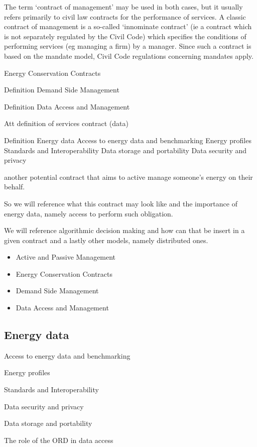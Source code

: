 \documentclass[]{book}
\theoremstyle{definition}
\theoremstyle{definition}
\theoremstyle{definition}
\theoremstyle{remark}
\begin{document}
The term `contract of management' may be used in both cases, but it
usually refers primarily to civil law contracts for the performance of
services. A classic contract of management is a so-called `innominate
contract' (ie a contract which is not separately regulated by the Civil
Code) which specifies the conditions of performing services (eg managing
a firm) by a manager. Since such a contract is based on the mandate
model, Civil Code regulations concerning mandates apply.

Energy Conservation Contracts

Definition Demand Side Management

Definition Data Access and Management

Att definition of services contract (data)

Definition Energy data Access to energy data and benchmarking Energy
profiles Standards and Interoperability Data storage and portability
Data security and privacy

another potential contract that aims to active manage someone's energy
on their behalf.

So we will reference what this contract may look like and the importance
of energy data, namely access to perform such obligation.

We will reference algorithmic decision making and how can that be insert
in a given contract and a lastly other models, namely distributed ones.

\begin{itemize}
\item
  Active and Passive Management
\item
  Energy Conservation Contracts
\item
  Demand Side Management
\item
  Data Access and Management
\end{itemize}

\subsection{Energy data}\label{energy-data}

Access to energy data and benchmarking

Energy profiles

Standards and Interoperability

Data security and privacy

Data storage and portability

The role of the ORD in data access
\end{document}
